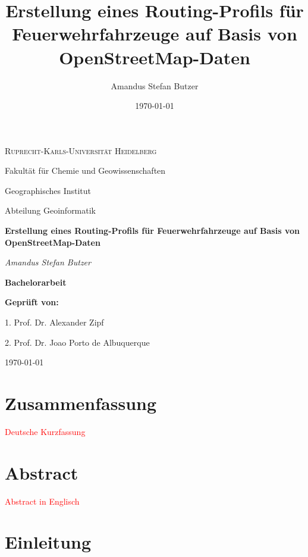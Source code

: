 \documentclass[12pt,a4paper]{article}
\author{Amandus Stefan Butzer}
\title{Erstellung eines Routing-Profils für Feuerwehrfahrzeuge auf Basis von OpenStreetMap-Daten}
\date{\today}
\newcommand\todo[1]{\textcolor{red}{#1}}
\begin{document}
\begin{titlepage}
\begin{center}

	{\scshape\LARGE Ruprecht-Karls-Universität Heidelberg\par}
	\vspace{1.0cm}
	{\large Fakultät für Chemie und Geowissenschaften \par Geographisches Institut \par Abteilung Geoinformatik\par}
	\vspace{2.5cm}
	{\Huge\bfseries Erstellung eines Routing-Profils für Feuerwehrfahrzeuge auf Basis von OpenStreetMap-Daten\par}
	\vspace{2cm}
	{\Large\itshape Amandus Stefan Butzer\par}
	\vspace{2cm}
	{\LARGE\bfseries Bachelorarbeit\par}
	
	\vfill
	{\bfseries Geprüft von:}
	{\par 1. Prof. Dr. Alexander Zipf}
	{\par 2. Prof. Dr. Joao Porto de Albuquerque}

	\vfill

	{\large \today\par}
\end{center}
\end{titlepage}

\newpage
{}

{\centering\section*{Zusammenfassung}}
\todo{Deutsche Kurzfassung}\par
\lipsum

\newpage
{\centering\section*{Abstract}}
\todo{Abstract in Englisch}
\lipsum

\newpage
\tableofcontents

\newpage
\listoffigures

\printglossary[type=\acronymtype, title=Abkürzungsverzeichnis, toctitle=Abkürzungsverzeichnis]

\newpage
{}
\section{Einleitung}
\end{document}
